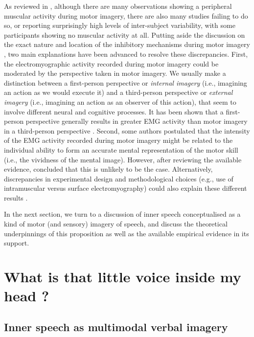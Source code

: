 \documentclass[a4paper,12pt,oneside,oldfontcommands]{memoir}
\begin{document}
As reviewed in \citet{guillot_electromyographic_2010}, although there
are many observations showing a peripheral muscular activity during
motor imagery, there are also many studies failing to do so, or
reporting surprisingly high levels of inter-subject variability, with
some participants showing no muscular activity at all. Putting aside the
discussion on the exact nature and location of the inhibitory mechanisms
during motor imagery \citep[see][]{guillot_imagining_2012}, two main
explanations have been advanced to resolve these discrepancies. First,
the electromyographic activity recorded during motor imagery could be
moderated by the perspective taken in motor imagery. We usually make a
distinction between a first-person perspective or \emph{internal
imagery} (i.e., imagining an action as we would execute it) and a
third-person perspective or \emph{external imagery} (i.e., imagining an
action as an observer of this action), that seem to involve different
neural and cognitive processes. It has been shown that a first-person
perspective generally results in greater EMG activity than motor imagery
in a third-person perspective
\citep{hale_effects_1982, harris_effects_1986}. Second, some authors
postulated that the intensity of the EMG activity recorded during motor
imagery might be related to the individual ability to form an accurate
mental representation of the motor skill (i.e., the vividness of the
mental image). However, after reviewing the available evidence,
\citet{guillot_brain_2009} concluded that this is unlikely to be the
case. Alternatively, discrepancies in experimental design and
methodological choices (e.g., use of intramuscular versus surface
electromyography) could also explain these different results
\citep{guillot_electromyographic_2010}.

In the next section, we turn to a discussion of inner speech
conceptualised as a kind of motor (and sensory) imagery of speech, and
discuss the theoretical underpinnings of this proposition as well as the
available empirical evidence in its support.

\section{What is that little voice inside my head
?}\label{what-is-that-little-voice-inside-my-head}

\subsection{Inner speech as multimodal verbal
imagery}\label{inner-speech-as-multimodal-verbal-imagery}
\end{document}
